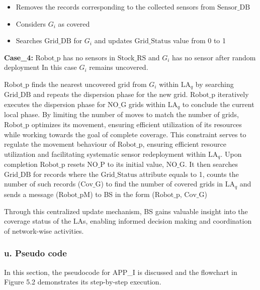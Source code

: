 \documentclass{article}
\begin{document}
\begin{itemize}
    \item Removes the records corresponding to the collected sensors from $\text{Sensor\_DB}$
    \item Considers $G_i$ as covered
    \item Searches $\text{Grid\_DB}$ for $G_i$ and updates $\text{Grid\_Status}$ value from 0 to 1
\end{itemize}

\noindent\textbf{Case\_4:} $\text{Robot\_p}$ has no sensors in $\text{Stock\_RS}$ and $G_i$ has no sensor after random deployment
In this case $G_i$ remains uncovered.

$\text{Robot\_p}$ finds the nearest uncovered grid from $G_i$ within $\text{LA}_q$ by searching $\text{Grid\_DB}$ and repeats the dispersion phase for the new grid. $\text{Robot\_p}$ iteratively executes the dispersion phase for $\text{NO\_G}$ grids within $\text{LA}_q$ to conclude the current local phase. By limiting the number of moves to match the number of grids, $\text{Robot\_p}$ optimizes its movement, ensuring efficient utilization of its resources while working towards the goal of complete coverage. This constraint serves to regulate the movement behaviour of $\text{Robot\_p}$, ensuring efficient resource utilization and facilitating systematic sensor redeployment within $\text{LA}_q$. Upon completion $\text{Robot\_p}$ resets $\text{NO\_P}$ to its initial value, $\text{NO\_G}$. It then searches $\text{Grid\_DB}$ for records where the $\text{Grid\_Status}$ attribute equals to 1, counts the number of such records ($\text{Cov\_G}$) to find the number of covered grids in $\text{LA}_q$ and sends a message ($\text{Robot\_pM}$) to BS in the form ($\text{Robot\_p}$, $\text{Cov\_G}$)

Through this centralized update mechanism, BS gains valuable insight into the coverage status of the LAs, enabling informed decision making and coordination of network-wise activities.

\subsubsection*{u. Pseudo code}

In this section, the pseudocode for APP\_I is discussed and the flowchart in Figure 5.2 demonstrates its step-by-step execution.

\captionsetup{labelformat=empty,textformat=empty} %
\captionsetup{labelformat=default,textformat=default} %
\end{document}
